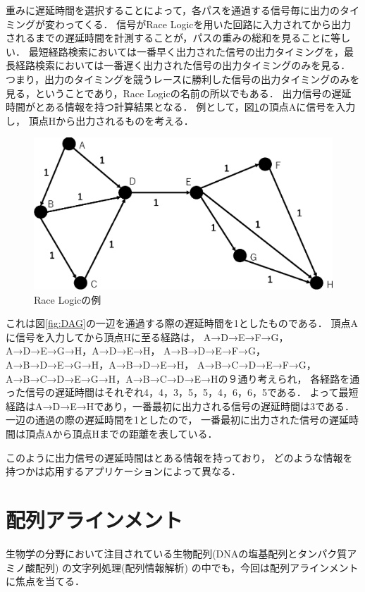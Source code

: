 重みに遅延時間を選択することによって，各パスを通過する信号毎に出力のタイミングが変わってくる．
信号がRace Logicを用いた回路に入力されてから出力されるまでの遅延時間を計測することが，パスの重みの総和を見ることに等しい．
最短経路検索においては一番早く出力された信号の出力タイミングを，最長経路検索においては一番遅く出力された信号の出力タイミングのみを見る．
つまり，出力のタイミングを競うレースに勝利した信号の出力タイミングのみを見る，ということであり，Race Logicの名前の所以でもある．
出力信号の遅延時間がとある情報を持つ計算結果となる．
例として，図\ref{fig:DAG1}の頂点Aに信号を入力し，
頂点Hから出力されるものを考える．
\begin{figure}[t!]
\begin{center}
\includegraphics[keepaspectratio,scale=0.5]{fig/2/DAG1.eps}
\caption{Race Logicの例}
\label{fig:DAG1}
\end{center}
\end{figure}
これは図\ref{fig:DAG}の一辺を通過する際の遅延時間を1としたものである．
頂点Aに信号を入力してから頂点Hに至る経路は，
A→D→E→F→G，A→D→E→G→H，A→D→E→H，
A→B→D→E→F→G，A→B→D→E→G→H，A→B→D→E→H，
A→B→C→D→E→F→G，A→B→C→D→E→G→H，A→B→C→D→E→Hの９通り考えられ，
各経路を通った信号の遅延時間はそれぞれ4，4，3，5，5，4，6，6，5である．
よって最短経路はA→D→E→Hであり，一番最初に出力される信号の遅延時間は3である．
一辺の通過の際の遅延時間を1としたので，
一番最初に出力された信号の遅延時間は頂点Aから頂点Hまでの距離を表している．

このように出力信号の遅延時間はとある情報を持っており，
どのような情報を持つかは応用するアプリケーションによって異なる．

\section{配列アラインメント}
生物学の分野において注目されている生物配列(DNAの塩基配列とタンパク質アミノ酸配列) の文字列処理(配列情報解析)
\cite{浅井潔2000配列情報と確立モデル,後藤修1998マルチプルアラインメントは生体高分子情報の交差点}
の中でも，今回は配列アラインメントに焦点を当てる．

